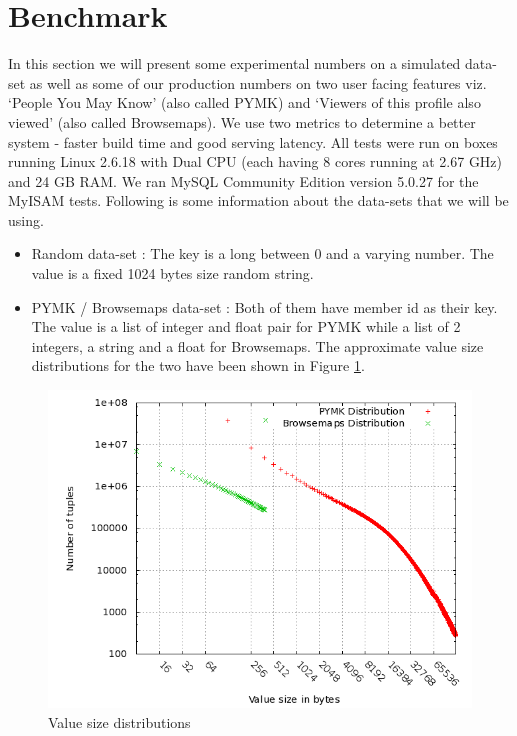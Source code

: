 \documentclass[twocolumn]{article}
\begin{document}
\section{Benchmark}
\label{sec:benchmark}

In this section we will present some experimental numbers on a simulated data-set as well as some of our production numbers on two user facing features viz. `People You May Know' (also called PYMK) and `Viewers of this profile also viewed' (also called Browsemaps). We use two metrics to determine a better system - faster build time and good serving latency. All tests were run on boxes running Linux 2.6.18 with Dual CPU (each having 8 cores running at 2.67 GHz) and 24 GB RAM. We ran MySQL Community Edition version 5.0.27 for the MyISAM tests. Following is some information about the data-sets that we will be using. 

\begin{itemize}
	\item Random data-set : The key is a long between 0 and a varying number. The value is a fixed 1024 bytes size random string. 
	\item PYMK / Browsemaps data-set : Both of them have member id as their key. The value is a list of integer and float pair for PYMK while a list of 2 integers, a string and a float for Browsemaps. The approximate value size distributions for the two have been shown in Figure \ref{distribution}.  
\end{itemize}

\begin{figure}
  \centering
    \includegraphics[scale=0.35]{images/distribution.png}
  \caption{Value size distributions}
  \label{distribution}
\end{figure}
\end{document}
